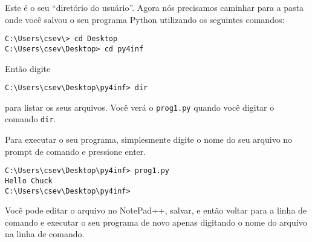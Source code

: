 Este é o seu ``diretório do usuário''. Agora nós precisamos
caminhar para a pasta onde você salvou o seu programa Python
utilizando os seguintes comandos:
%

\beforeverb
\begin{verbatim}
C:\Users\csev\> cd Desktop
C:\Users\csev\Desktop> cd py4inf
\end{verbatim}
\afterverb

Então digite
%

\beforeverb
\begin{verbatim}
C:\Users\csev\Desktop\py4inf> dir 
\end{verbatim}
\afterverb

para listar os seus arquivos. Você verá o {\tt prog1.py} quando
você digitar o comando {\tt dir}.
%

Para executar o seu programa, simplesmente digite o nome do seu
arquivo no prompt de comando e pressione enter.

\beforeverb
\begin{verbatim}
C:\Users\csev\Desktop\py4inf> prog1.py
Hello Chuck
C:\Users\csev\Desktop\py4inf> 
\end{verbatim}
\afterverb

Você pode editar o arquivo no NotePad++, salvar, e então voltar para
a linha de comando e executar o seu programa de novo apenas digitando
o nome do arquivo na linha de comando.
%

